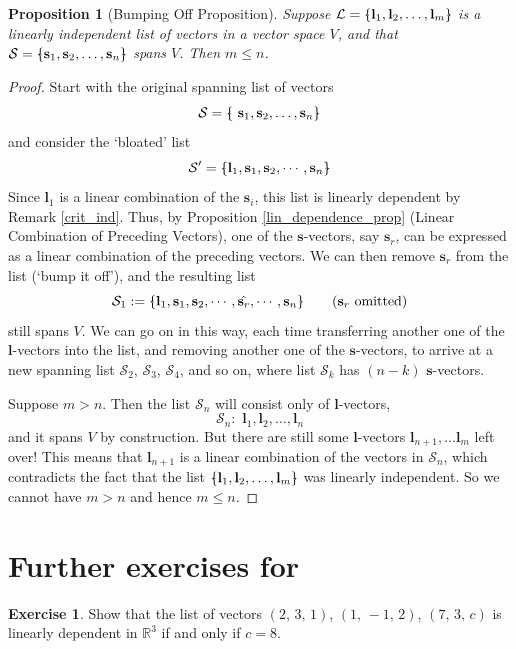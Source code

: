 \documentclass[a4paper,11pt]{book}
\newtheorem{proposition}[theorem]{Proposition}
\theoremstyle{definition}
\newtheorem{exercise}{Exercise}
\newcommand{\be}{\begin{equation}}
\newcommand{\ee}{\end{equation}}
\newcommand{\ve}[1]{\mathbf{#1}}
\newcommand{\basis}[1]{{\mathcal #1}}
\newcommand{\furtherexercises}{\section*{Further exercises for \thesection}}
\newcommand{\bmark}{\raisebox{.53ex}{\rule{.2em}{.1ex}}}
\newcommand{\bopen}{{\protect\ooalign{\{\cr\hfil\bmark\hfil\cr}}}
\newcommand{\bclose}{{\protect\ooalign{\}\cr\hfil\bmark\hfil\cr}}}
\begin{document}
\begin{proposition}[Bumping Off Proposition] Suppose $\basis{L} = \bopen \ve{l}_1, \ve{l}_2, \ldots, \ve{l}_m \bclose$ is a linearly independent list of vectors in a vector space $V$, and that $\basis{S} = \bopen \ve{s}_1, \ve{s}_2, \ldots, \ve{s}_n \bclose$ spans $V$. Then $m \leq n$. \label{bumping_off_lemma}
\end{proposition}
\begin{proof} Start with the original spanning list of vectors
\be
 \basis{S} = \bopen \,\,  \ve{s}_1, \ve{s}_2, \ldots, \ve{s}_n \bclose
\ee
and consider the `bloated' list
\be \label{bloated_list}
 \basis{S}' = \bopen \ve{l}_1, \ve{s}_1, \ve{s}_2, \cdots, \ve{s}_n \bclose
\ee
Since $\ve{l}_1$ is a linear combination of the $\ve{s}_i$, this list is linearly dependent by Remark \ref{crit_ind}. Thus, by Proposition \ref{lin_dependence_prop} (Linear Combination of Preceding Vectors), one of the $\ve{s}$-vectors, say $\ve{s}_r$, can be expressed as a linear combination of the preceding vectors. We can then remove $\ve{s}_r$ from the list (`bump it off'), and the resulting list
\be
 \basis{S}_1 :=  \bopen \ve{l}_1, \ve{s}_1, \ve{s}_2, \cdots, \hat{\ve{s}_r}, \cdots, \ve{s}_n \bclose \qquad \mbox{($\ve{s}_r$ omitted)}
\ee
still spans $V$. We can go on in this way, each time transferring another one of the $\ve{l}$-vectors into the list, and removing another one of the $\ve{s}$-vectors, to arrive at a new spanning list $\basis{S}_2$, $\basis{S}_3$, $\basis{S}_4$, and so on, where list $\basis{S}_k$ has $(n-k)$ $\ve{s}$-vectors. 

Suppose $m > n$. Then the list $\basis{S}_n$ will consist only of $\ve{l}$-vectors,
\[
 \basis{S}_n: \,\, \ve{l}_1, \ve{l}_2, \ldots, \ve{l}_n
\]
and it spans $V$ by construction. But there are still some $\ve{l}$-vectors $\ve{l}_{n+1}, \ldots \ve{l}_{m}$ left over! This means that $\ve{l}_{n+1}$ is a linear combination of the vectors in $\basis{S}_n$, which contradicts the fact that the list $\bopen \ve{l}_1, \ve{l}_2, \ldots, \ve{l}_m \bclose$ was linearly independent. So we cannot have $m > n$ and hence $m \leq n$.
\end{proof}

\furtherexercises

\begin{exercise}  Show that the list of vectors $(2, \, 3, \, 1)$, $(1, \, -1, \, 2)$, $(7, \, 3, \, c)$ is linearly dependent in $\mathbb{R}^3$ if and only if $c=8$.
\end{exercise}
\end{document}
